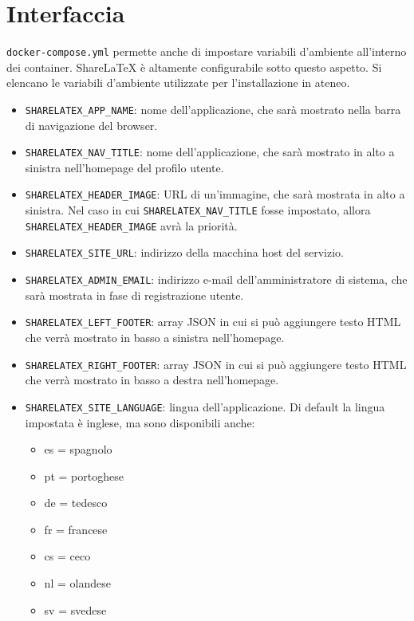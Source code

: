 \section{Interfaccia}
\verb|docker-compose.yml| permette anche di impostare variabili d'ambiente all'interno dei container. ShareLaTeX è altamente configurabile sotto questo aspetto. Si elencano le variabili d'ambiente utilizzate per l'installazione in ateneo.
\begin{itemize}
    \item \verb|SHARELATEX_APP_NAME|: nome dell'applicazione, che sarà mostrato nella barra di navigazione del browser.
    \item \verb|SHARELATEX_NAV_TITLE|: nome dell'applicazione, che sarà mostrato in alto a sinistra nell'homepage del profilo utente.
    \item \verb|SHARELATEX_HEADER_IMAGE|: URL di un'immagine, che sarà mostrata in alto a sinistra. Nel caso in cui \verb|SHARELATEX_NAV_TITLE| fosse impostato, allora\\\verb|SHARELATEX_HEADER_IMAGE| avrà la priorità.
    \item \verb|SHARELATEX_SITE_URL|: indirizzo della macchina host del servizio.
    \item \verb|SHARELATEX_ADMIN_EMAIL|: indirizzo e-mail dell'amministratore di sistema, che sarà mostrata in fase di registrazione utente.
    \item \verb|SHARELATEX_LEFT_FOOTER|: array JSON in cui si può aggiungere testo HTML che verrà mostrato in basso a sinistra nell'homepage.
    \item \verb|SHARELATEX_RIGHT_FOOTER|: array JSON in cui si può aggiungere testo HTML che verrà mostrato in basso a destra nell'homepage.
    \item \verb|SHARELATEX_SITE_LANGUAGE|: lingua dell'applicazione. Di default la lingua impostata è inglese, ma sono disponibili anche:
        \begin{multicols}{3}
            \begin{itemize}
                \item es = spagnolo
                \item pt = portoghese
                \item de = tedesco
                \item fr = francese
                \item cs = ceco
                \item nl = olandese
                \item sv = svedese

\end{itemize}
\end{multicols}
\end{itemize}
